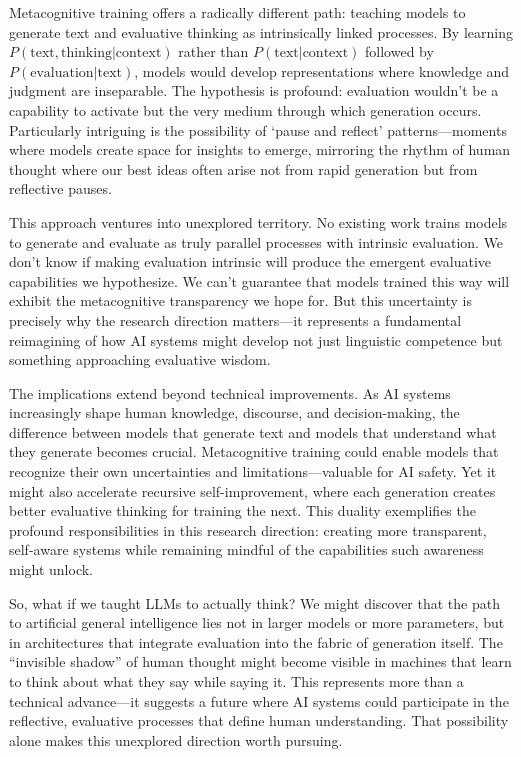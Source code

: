 \documentclass[11pt]{article}
\begin{document}
	Metacognitive training offers a radically different path: teaching models to generate text and evaluative thinking as intrinsically linked processes. By learning $P(\text{text}, \text{thinking}|\text{context})$ rather than $P(\text{text}|\text{context})$ followed by $P(\text{evaluation}|\text{text})$, models would develop representations where knowledge and judgment are inseparable. The hypothesis is profound: evaluation wouldn't be a capability to activate but the very medium through which generation occurs. Particularly intriguing is the possibility of `pause and reflect' patterns---moments where models create space for insights to emerge, mirroring the rhythm of human thought where our best ideas often arise not from rapid generation but from reflective pauses.
	
	This approach ventures into unexplored territory. No existing work trains models to generate and evaluate as truly parallel processes with intrinsic evaluation. We don't know if making evaluation intrinsic will produce the emergent evaluative capabilities we hypothesize. We can't guarantee that models trained this way will exhibit the metacognitive transparency we hope for. But this uncertainty is precisely why the research direction matters---it represents a fundamental reimagining of how AI systems might develop not just linguistic competence but something approaching evaluative wisdom.
	
	The implications extend beyond technical improvements. As AI systems increasingly shape human knowledge, discourse, and decision-making, the difference between models that generate text and models that understand what they generate becomes crucial. Metacognitive training could enable models that recognize their own uncertainties and limitations---valuable for AI safety. Yet it might also accelerate recursive self-improvement, where each generation creates better evaluative thinking for training the next. This duality exemplifies the profound responsibilities in this research direction: creating more transparent, self-aware systems while remaining mindful of the capabilities such awareness might unlock.
	
	So, what if we taught LLMs to actually think? We might discover that the path to artificial general intelligence lies not in larger models or more parameters, but in architectures that integrate evaluation into the fabric of generation itself. The ``invisible shadow'' of human thought might become visible in machines that learn to think about what they say while saying it. This represents more than a technical advance---it suggests a future where AI systems could participate in the reflective, evaluative processes that define human understanding. That possibility alone makes this unexplored direction worth pursuing.
	
	
	
	
\end{document}
